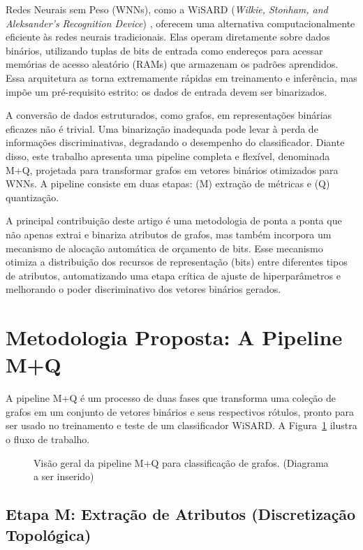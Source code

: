 \documentclass[12pt]{article}
\begin{document}
Redes Neurais sem Peso (WNNs), como a WiSARD (\textit{Wilkie, Stonham, and Aleksander's Recognition Device}) \cite{aleksander1984}, oferecem uma alternativa computacionalmente eficiente às redes neurais tradicionais. Elas operam diretamente sobre dados binários, utilizando tuplas de bits de entrada como endereços para acessar memórias de acesso aleatório (RAMs) que armazenam os padrões aprendidos. Essa arquitetura as torna extremamente rápidas em treinamento e inferência, mas impõe um pré-requisito estrito: os dados de entrada devem ser binarizados.

A conversão de dados estruturados, como grafos, em representações binárias eficazes não é trivial. Uma binarização inadequada pode levar à perda de informações discriminativas, degradando o desempenho do classificador. Diante disso, este trabalho apresenta uma pipeline completa e flexível, denominada M+Q, projetada para transformar grafos em vetores binários otimizados para WNNs. A pipeline consiste em duas etapas: (M) extração de métricas e (Q) quantização.

A principal contribuição deste artigo é uma metodologia de ponta a ponta que não apenas extrai e binariza atributos de grafos, mas também incorpora um mecanismo de alocação automática de orçamento de bits. Esse mecanismo otimiza a distribuição dos recursos de representação (bits) entre diferentes tipos de atributos, automatizando uma etapa crítica de ajuste de hiperparâmetros e melhorando o poder discriminativo dos vetores binários gerados.

\section{Metodologia Proposta: A Pipeline M+Q}

A pipeline M+Q é um processo de duas fases que transforma uma coleção de grafos em um conjunto de vetores binários e seus respectivos rótulos, pronto para ser usado no treinamento e teste de um classificador WiSARD. A Figura~\ref{fig:pipeline} ilustra o fluxo de trabalho.

\begin{figure}[ht]
\centering
\caption{Visão geral da pipeline M+Q para classificação de grafos. (Diagrama a ser inserido)}
\label{fig:pipeline}
\end{figure}

\subsection{Etapa M: Extração de Atributos (Discretização Topológica)}
\end{document}
